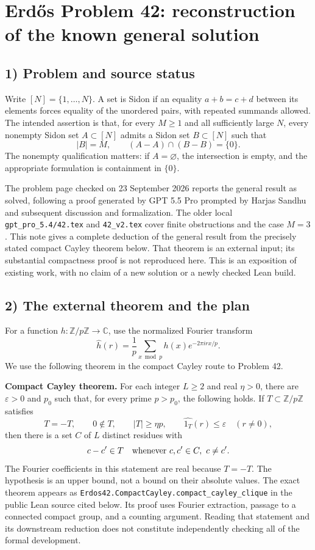 \section{Erd\H{o}s Problem 42: reconstruction of the known general solution}

\subsection{1) Problem and source status}
Write $[N]=\{1,\ldots,N\}$. A set is Sidon if an equality
$a+b=c+d$ between its elements forces equality of the unordered pairs,
with repeated summands allowed. The intended assertion is that, for every
$M\geq1$ and all sufficiently large $N$, every nonempty Sidon set
$A\subset[N]$ admits a Sidon set $B\subset[N]$ such that
\[
 |B|=M,\qquad (A-A)\cap(B-B)=\{0\}.
\]
The nonempty qualification matters: if $A=\varnothing$, the intersection is
empty, and the appropriate formulation is containment in $\{0\}$.

The problem page checked on 23 September 2026 reports the general result as
solved, following a proof generated by GPT 5.5 Pro prompted by Harjas Sandhu
and subsequent discussion and formalization. The older local
\texttt{gpt\_pro\_5.4/42.tex} and \texttt{42\_v2.tex} cover finite
obstructions and the case $M=3$. This note gives a complete deduction of
the general result from the precisely stated compact Cayley theorem below.
That theorem is an external input; its substantial compactness proof is
not reproduced here. This is an exposition of existing work, with no
claim of a new solution or a newly checked Lean build.

\subsection{2) The external theorem and the plan}
For a function $h:\mathbb Z/p\mathbb Z\to\mathbb C$, use the normalized
Fourier transform
\[
 \widehat h(r)=\frac1p\sum_{x\bmod p}h(x)e^{-2\pi i rx/p}.
\]
We use the following theorem in the compact Cayley route to Problem 42.

\textbf{Compact Cayley theorem.}
For each integer $L\geq2$ and real $\eta>0$, there are
$\varepsilon>0$ and $p_0$ such that, for every prime $p>p_0$, the following
holds. If $T\subset\mathbb Z/p\mathbb Z$ satisfies
\[
 T=-T,\qquad 0\notin T,\qquad |T|\geq\eta p,
 \qquad \widehat{1_T}(r)\leq\varepsilon\quad(r\neq0),
\]
then there is a set $C$ of $L$ distinct residues with
\[
 c-c'\in T\quad\hbox{whenever }c,c'\in C,\ c\neq c'.
\]
The Fourier coefficients in this statement are real because $T=-T$.
The hypothesis is an upper bound, not a bound on their absolute values.
The exact theorem appears as
\texttt{Erdos42.CompactCayley.compact\_cayley\_clique} in the public
Lean source cited below. Its proof uses Fourier extraction, passage to a
connected compact group, and a counting argument. Reading that statement
and its downstream reduction does not constitute independently checking
all of the formal development.

